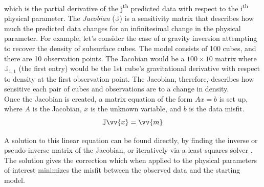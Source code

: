 
\noindent
which is the partial derivative of the j\textsuperscript{th} predicted data with respect to the i\textsuperscript{th} physical parameter. The \textit{Jacobian} ($\mathbb{J}$) is a sensitivity matrix that describes how much the predicted data changes for an infinitesimal change in the physical parameter. For example, let's consider the case of a gravity inversion attempting to recover the density of subsurface cubes. The model consists of 100 cubes, and there are 10 observation points. The Jacobian would be a $100 \times 10$ matrix where $\mathbb{J}_{1,1}$ (the first entry) would be the 1st cube's gravitational derivative with respect to density at the first observation point. The Jacobian, therefore, describes how sensitive each pair of cubes and observations are to a change in density. \\

Once the Jacobian is created, a matrix equation of the form $Ax=b$ is set up, where $A$ is the Jacobian, $x$ is the unknown variable, and $b$ is the data misfit.  
\begin{equation} \label{eq:matrix_eq}
    \mathbb{J} \vv{x} = \vv{m}
\end{equation}

A solution to this linear equation can be found directly, by finding the inverse or pseudo-inverse matrix of the Jacobian, or iteratively via a least-squares solver \citep{jacobygravity2009}. The solution gives the correction which when applied to the physical parameters of interest minimizes the misfit between the observed data and the starting model. 

